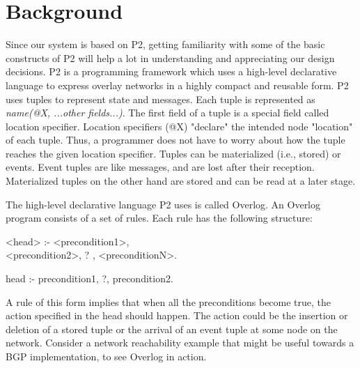 \section{Background}

Since our system is based on P2, getting familiarity with some of the
basic constructs of P2 will help a lot in understanding and appreciating
our design decisions. P2 is a programming framework which uses a
high-level declarative language to express overlay networks in a highly
compact and reusable form. P2 uses tuples to represent state and
messages. Each tuple is represented as {\em name(@X, ...other
  fields...)}. The first field of a tuple is a special field called
location specifier. Location specifiers (@X) "declare" the intended node
"location" of each tuple. Thus, a programmer does not have to worry
about how the tuple reaches the given location specifier. Tuples can be
materialized (i.e.,  stored) or events. Event tuples are like messages,
and are lost after their reception. Materialized tuples on the other hand are stored and can be read at a later stage.

The high-level declarative language P2 uses is called Overlog. An
Overlog program consists of a set of rules. Each rule has the following structure:
\begin{code}
<head> :- <precondition1>, \\
\> <precondition2>, ? , <preconditionN>.
\end{code}
\begin{overlog}
head :- precondition1, ?, precondition2.
\end{overlog}
A rule of this form implies that when all the preconditions become true,
the action specified in the head should happen. The action could be the
insertion or deletion of a stored tuple or the arrival of an event tuple
at some node on the network. Consider a network reachability example
that might be useful towards a BGP implementation, to see Overlog in action. 

